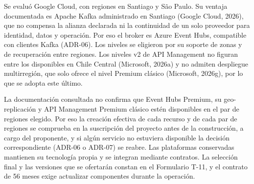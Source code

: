 \documentclass[11pt]{article}
\begin{document}
Se evaluó Google Cloud, con regiones en Santiago y São Paulo. Su ventaja documentada es Apache Kafka administrado en Santiago (Google Cloud, 2026), que no compensa la alianza declarada ni la continuidad de un solo proveedor para identidad, datos y operación. Por eso el broker es Azure Event Hubs, compatible con clientes Kafka (ADR-06). Los niveles se eligieron por su soporte de zonas y de recuperación entre regiones. Los niveles v2 de API Management no figuran entre los disponibles en Chile Central (Microsoft, 2026a) y no admiten despliegue multirregión, que solo ofrece el nivel Premium clásico (Microsoft, 2026g), por lo que se adopta este último.

La documentación consultada no confirma que Event Hubs Premium, su geo-replicación y API Management Premium clásico estén disponibles en el par de regiones elegido. Por eso la creación efectiva de cada recurso y de cada par de regiones se comprueba en la suscripción del proyecto antes de la construcción, a cargo del proponente, y si algún servicio no estuviera disponible la decisión correspondiente (ADR-06 o ADR-07) se reabre. Las plataformas conservadas mantienen su tecnología propia y se integran mediante contratos. La selección final y las versiones que se ofertarán constan en el Formulario T-11, y el contrato de 56 meses exige actualizar componentes durante la operación.

\par\vspace{0pt plus 10\baselineskip}\vspace{0pt plus -10\baselineskip}
\end{document}
